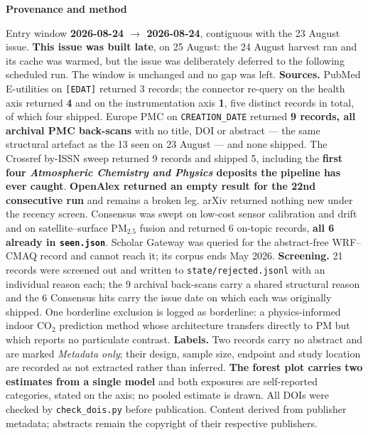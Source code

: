 \documentclass[10pt]{article}
\begin{document}
\vspace{2mm}
\begin{keybox}
{\sffamily\bfseries\footnotesize\color{Deep}Provenance and method}\\[1.2mm]
{\fontsize{7.2}{8.8}\selectfont
Entry window \textbf{2026-08-24 $\rightarrow$ 2026-08-24}, contiguous with the 23 August
issue. \textbf{This issue was built late}, on 25 August: the 24 August harvest ran and its
cache was warmed, but the issue was deliberately deferred to the following scheduled run.
The window is unchanged and no gap was left. \textbf{Sources.} PubMed E-utilities on
\texttt{[EDAT]} returned 3 records; the connector re-query on the health axis returned
\textbf{4} and on the instrumentation axis \textbf{1}, five distinct records in total,
of which four shipped. Europe PMC on \texttt{CREATION\_DATE} returned \textbf{9 records,
all archival PMC back-scans} with no title, DOI or abstract --- the same structural
artefact as the 13 seen on 23 August --- and none shipped. The Crossref by-ISSN sweep
returned 9 records and shipped 5, including the \textbf{first four \textit{Atmospheric
Chemistry and Physics} deposits the pipeline has ever caught}. \textbf{OpenAlex returned
an empty result for the 22nd consecutive run} and remains a broken leg. arXiv returned
nothing new under the recency screen. Consensus was swept on low-cost sensor calibration
and drift and on satellite--surface PM$_{2.5}$ fusion and returned 6 on-topic records,
\textbf{all 6 already in \texttt{seen.json}}. Scholar Gateway was queried for the
abstract-free WRF--CMAQ record and cannot reach it; its corpus ends May 2026.
\textbf{Screening.} 21 records were screened out and written to
\texttt{state/rejected.jsonl} with an individual reason each; the 9 archival back-scans
carry a shared structural reason and the 6 Consensus hits carry the issue date on which
each was originally shipped. One borderline exclusion is logged as borderline: a
physics-informed indoor CO$_2$ prediction method whose architecture transfers directly to
PM but which reports no particulate contrast. \textbf{Labels.} Two records carry no
abstract and are marked \textit{Metadata only}; their design, sample size, endpoint and
study location are recorded as not extracted rather than inferred. \textbf{The forest plot
carries two estimates from a single model} and both exposures are self-reported
categories, stated on the axis; no pooled estimate is drawn. All DOIs were checked by
\texttt{check\_dois.py} before publication. Content derived from publisher metadata;
abstracts remain the copyright of their respective publishers.\par}
\end{keybox}
\end{document}
